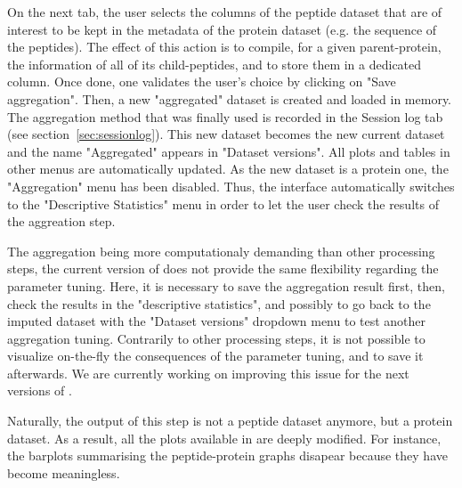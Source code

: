 \documentclass[12pt]{article}
\begin{document}
{On the next tab, the user selects the columns of the peptide dataset that 
are of interest to be kept in the metadata of the protein dataset (e.g. the 
sequence of the peptides). The effect of this action is to compile, for a 
given parent-protein, the information of all of its child-peptides, and to 
store them in a dedicated column. Once done, one validates the user's choice 
by clicking on "Save aggregation". Then, a new "aggregated" dataset is 
created and loaded in memory. The aggregation method that was finally used is 
recorded in the Session log tab (see section~\ref{sec:sessionlog}). This new 
dataset becomes the new current dataset and the name "Aggregated" appears in 
"Dataset versions". All plots and tables in other menus are automatically 
updated.
As the new dataset is a protein one, the "Aggregation" menu has been disabled. Thus, the interface automatically switches to the "Descriptive Statistics" menu in order to let the user check the results of the aggreation step.

The aggregation being more computationaly demanding than other processing 
steps, the current version of  does not provide the same 
flexibility regarding the parameter tuning. Here, it is necessary to save the 
aggregation result first, then, check the results in the "descriptive statistics", and possibly to go back to the imputed dataset with the "Dataset 
versions" dropdown menu to test another aggregation tuning. Contrarily to 
other processing steps, it is not possible to visualize on-the-fly the 
consequences of the parameter tuning, and to save it afterwards. We are 
currently working on improving this issue for the next versions 
of . 

Naturally, the output of this step is not a peptide dataset anymore, but a 
protein dataset. As a result, all the plots available in  
are deeply modified. For instance, the barplots summarising the 
peptide-protein graphs disapear because they have become meaningless.



}
\end{document}
